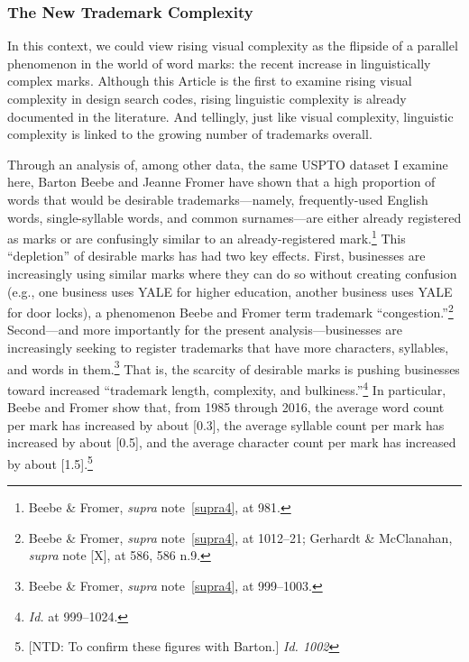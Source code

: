 \documentclass[letterpaper, 11pt, oneside]{article}
\begin{document}
\subsubsection{The New Trademark Complexity}\label{subsec:2C}

In this context, we could view rising visual complexity as the flipside of a parallel phenomenon in the world of word marks: the recent increase in linguistically complex marks. Although this Article is the first to examine rising visual complexity in design search codes, rising linguistic complexity is already documented in the literature. And tellingly, just like visual complexity, linguistic complexity is linked to the growing number of trademarks overall.

Through an analysis of, among other data, the same USPTO dataset I examine here, Barton Beebe and Jeanne Fromer have shown that a high proportion of words that would be desirable trademarks—namely, frequently-used English words, single-syllable words, and common surnames—are either already registered as marks or are confusingly similar to an already-registered mark.\footnote{Beebe \& Fromer, \textit{supra} note~\ref{supra4}, at 981.} This ``depletion'' of desirable marks has had two key effects. First, businesses are increasingly using similar marks where they can do so without creating confusion (e.g., one business uses YALE for higher education, another business uses YALE for door locks), a phenomenon Beebe and Fromer term trademark ``congestion.''\footnote{Beebe \& Fromer, \textit{supra} note~\ref{supra4}, at 1012–21; Gerhardt \& McClanahan, \textit{supra} note [X], at 586, 586 n.9.} Second—and more importantly for the present analysis—businesses are increasingly seeking to register trademarks that have more characters, syllables, and words in them.\footnote{Beebe \& Fromer, \textit{supra} note~\ref{supra4}, at 999–1003.} That is, the scarcity of desirable marks is pushing businesses toward increased ``trademark length, complexity, and bulkiness.''\footnote{\textit{Id.} at 999–1024.}  In particular, Beebe and Fromer show that, from 1985 through 2016, the average word count per mark has increased by about [0.3], the average syllable count per mark has increased by about [0.5], and the average character count per mark has increased by about [1.5].\footnote{[NTD: To confirm these figures with Barton.] \textit{Id. 1002}}
\end{document}
